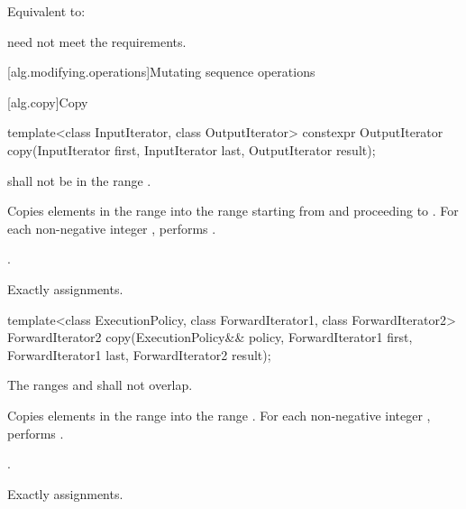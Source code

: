 \begin{itemdescr}
\pnum
\effects
Equivalent to: 

\pnum
\remarks
{} need not meet the  requirements.
\end{itemdescr}

[alg.modifying.operations]{Mutating sequence operations}

[alg.copy]{Copy}

%
\begin{itemdecl}
template<class InputIterator, class OutputIterator>
  constexpr OutputIterator copy(InputIterator first, InputIterator last,
                                OutputIterator result);
\end{itemdecl}

\begin{itemdescr}
\pnum
\requires {} shall not be in the range .

\pnum
\effects Copies elements in the range  into the range  starting from  and proceeding to . For each non-negative integer , performs .

\pnum
\returns {}.

\pnum
\complexity Exactly  assignments.
\end{itemdescr}

%
\begin{itemdecl}
template<class ExecutionPolicy, class ForwardIterator1, class ForwardIterator2>
  ForwardIterator2 copy(ExecutionPolicy&& policy,
                        ForwardIterator1 first, ForwardIterator1 last,
                        ForwardIterator2 result);
\end{itemdecl}

\begin{itemdescr}
\pnum
\requires The ranges  and
 shall not overlap.

\pnum
\effects Copies elements in the range  into
the range .
For each non-negative integer ,
performs .

\pnum
\returns {}.

\pnum
\complexity Exactly  assignments.
\end{itemdescr}

